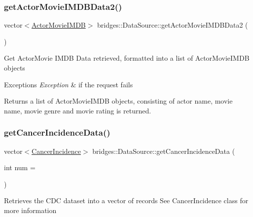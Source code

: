 \subsubsection{\texorpdfstring{get\+Actor\+Movie\+I\+M\+D\+B\+Data2()}{getActorMovieIMDBData2()}}
{\footnotesize\ttfamily vector$<$\mbox{\hyperlink{classbridges_1_1dataset_1_1_actor_movie_i_m_d_b}{Actor\+Movie\+I\+M\+DB}}$>$ bridges\+::\+Data\+Source\+::get\+Actor\+Movie\+I\+M\+D\+B\+Data2 (\begin{DoxyParamCaption}{ }\end{DoxyParamCaption})\hspace{0.3cm}{\ttfamily [inline]}}

Get Actor\+Movie I\+M\+DB Data retrieved, formatted into a list of Actor\+Movie\+I\+M\+DB objects


\begin{DoxyExceptions}{Exceptions}
{\em Exception} & if the request fails\\
\hline
\end{DoxyExceptions}
\begin{DoxyReturn}{Returns}
a list of Actor\+Movie\+I\+M\+DB objects, consisting of actor name, movie name, movie genre and movie rating is returned. 
\end{DoxyReturn}
\mbox{\label{classbridges_1_1_data_source_a52d8161e7c093ab3615acea7085f6689}} 
\subsubsection{\texorpdfstring{get\+Cancer\+Incidence\+Data()}{getCancerIncidenceData()}}
{\footnotesize\ttfamily vector$<$\mbox{\hyperlink{classbridges_1_1dataset_1_1_cancer_incidence}{Cancer\+Incidence}}$>$ bridges\+::\+Data\+Source\+::get\+Cancer\+Incidence\+Data (\begin{DoxyParamCaption}\item[{int}]{num = {} }\end{DoxyParamCaption})\hspace{0.3cm}{\ttfamily [inline]}}

Retrieves the C\+DC dataset into a vector of records See Cancer\+Incidence class for more information \mbox{\label{classbridges_1_1_data_source_aa65136879011e1ec237380ef8587fea2}} 

